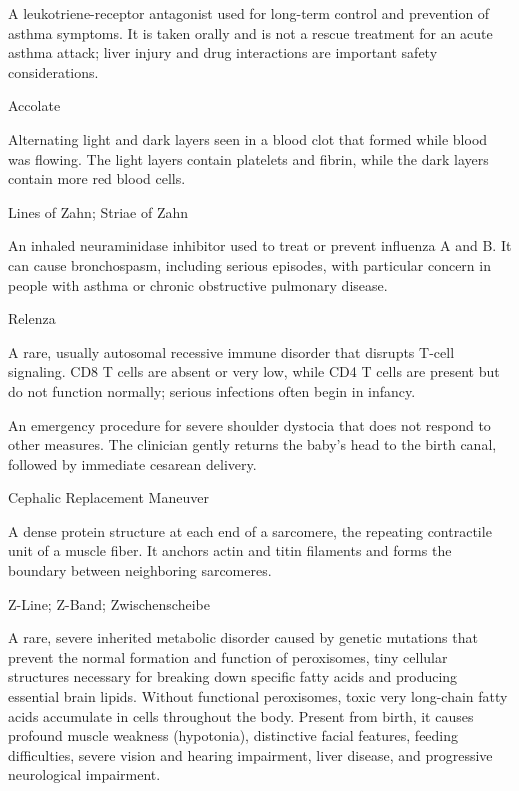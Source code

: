  A leukotriene-receptor antagonist used for long-term control and prevention of asthma symptoms. It is taken orally and is not a rescue treatment for an acute asthma attack; liver injury and drug interactions are important safety considerations.

\synonyms
Accolate

 Alternating light and dark layers seen in a blood clot that formed while blood was flowing. The light layers contain platelets and fibrin, while the dark layers contain more red blood cells.

\synonyms
Lines of Zahn; Striae of Zahn

 An inhaled neuraminidase inhibitor used to treat or prevent influenza A and B. It can cause bronchospasm, including serious episodes, with particular concern in people with asthma or chronic obstructive pulmonary disease.

\synonyms
Relenza

 A rare, usually autosomal recessive immune disorder that disrupts T-cell signaling. CD8 T cells are absent or very low, while CD4 T cells are present but do not function normally; serious infections often begin in infancy.

 An emergency procedure for severe shoulder dystocia that does not respond to other measures. The clinician gently returns the baby’s head to the birth canal, followed by immediate cesarean delivery.

\synonyms
Cephalic Replacement Maneuver

 A dense protein structure at each end of a sarcomere, the repeating contractile unit of a muscle fiber. It anchors actin and titin filaments and forms the boundary between neighboring sarcomeres.

\synonyms
Z-Line; Z-Band; Zwischenscheibe

 A rare, severe inherited metabolic disorder caused by genetic mutations that prevent the normal formation and function of peroxisomes, tiny cellular structures necessary for breaking down specific fatty acids and producing essential brain lipids. Without functional peroxisomes, toxic very long-chain fatty acids accumulate in cells throughout the body. Present from birth, it causes profound muscle weakness (hypotonia), distinctive facial features, feeding difficulties, severe vision and hearing impairment, liver disease, and progressive neurological impairment.

